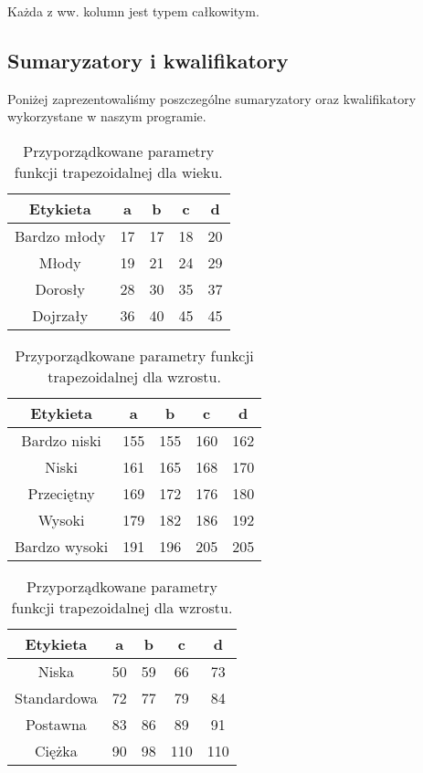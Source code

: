 \documentclass{classrep}
\begin{document}
Każda z ww. kolumn jest typem całkowitym.

\subsection{Sumaryzatory i kwalifikatory}Poniżej zaprezentowaliśmy poszczególne sumaryzatory oraz kwalifikatory wykorzystane w naszym programie. 

\begin{table}[H]
	\centering
	\begin{tabular}{c c c c c} 
		\hline
		\textbf{Etykieta} & \textbf{a} & \textbf{b} & \textbf{c} &  \textbf{d} \\ [0.5ex] 
		\hline
		\hline 
		Bardzo młody & 17 & 17 & 18 & 20 \\ 
		Młody & 19 & 21 & 24 & 29 \\
		Dorosły & 28 & 30 & 35 & 37 \\
		Dojrzały & 36 & 40 & 45 & 45\\
		\hline
	\end{tabular}
	\caption{Przyporządkowane parametry funkcji trapezoidalnej dla wieku.}
\end{table}

\begin{table}[H]
	\centering
	\begin{tabular}{c c c c c} 
		\hline
		\textbf{Etykieta} & \textbf{a} & \textbf{b} & \textbf{c} &  \textbf{d} \\ [0.5ex] 
		\hline
		\hline 
		Bardzo niski & 155 & 155 & 160 & 162 \\ 
		Niski & 161 & 165 & 168 & 170 \\
		Przeciętny & 169 & 172 & 176 & 180 \\
		Wysoki & 179 & 182 & 186 & 192\\
		Bardzo wysoki & 191 & 196 & 205 & 205\\
		\hline
	\end{tabular}
	\caption{Przyporządkowane parametry funkcji trapezoidalnej dla wzrostu.}
\end{table}

\begin{table}[H]
	\centering
	\begin{tabular}{c c c c c} 
		\hline
		\textbf{Etykieta} & \textbf{a} & \textbf{b} & \textbf{c} &  \textbf{d} \\ [0.5ex] 
		\hline
		\hline 
		Niska & 50 & 59 & 66 & 73 \\ 
		Standardowa & 72 & 77 & 79 & 84 \\
		Postawna & 83 & 86 & 89 & 91 \\
		Ciężka & 90 & 98 & 110 & 110\\
		\hline
	\end{tabular}
	\caption{Przyporządkowane parametry funkcji trapezoidalnej dla wzrostu.}
\end{table}
\end{document}

